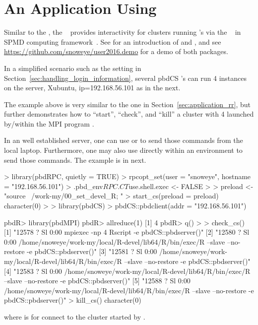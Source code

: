 
\section[An Application Using \pkg{pbdCS}]{An Application Using }
\label{sec:application_cs}

Similar to the , the ~\citep{pbdCS} provides
interactivity for clusters running 's via the
~\citep{Chen2012pbdMPIpackage} in SPMD computing
framework~\citep{pbdR2012,hpsc2012}.
See \citet{xsede16} for an introduction of  and , and
see \url{https://github.com/snoweye/user2016.demo}
for a demo of both packages.

In a simplified scenario such as the setting in
Section~\ref{sec:handling_login_information},
several pbdCS 's can run 4 instances on the server,
Xubuntu, ip=192.168.56.101 as in the next.
The example above is very similar to the one in
Section~\ref{sec:application_rr}, but further demonstrates
how to ``start'', ``check'', and ``kill''
a  cluster with 4  launched by/within
the MPI program .

In an well established server, one can use  or 
to send those commands from the local laptop.
Furthermore, one may also use  directly within an 
environment to send those commands. The example is in next.
\begin{Code}[title=Using \pkg{pbdRPC} to control \pkg{pbdCS}]
> library(pbdRPC, quietly = TRUE)
> rpcopt_set(user = "snoweye", hostname = "192.168.56.101")
> .pbd_env$RPC.CT$use.shell.exec <- FALSE
>
> preload <- "source ~/work-my/00_set_devel_R; "
> start_cs(preload = preload)
character(0)
>
> library(pbdCS)
> pbdCS::pbdclient(addr = "192.168.56.101")

pbdR> library(pbdMPI)
pbdR> allreduce(1)
[1] 4 
pbdR> q()
>
> check_cs()
[1] "12578 ?        Sl     0:00 mpiexec -np 4 Rscript -e pbdCS::pbdserver()"                                                      
[2] "12580 ?        Sl     0:00 /home/snoweye/work-my/local/R-devel/lib64/R/bin/exec/R --slave --no-restore -e pbdCS::pbdserver()"
[3] "12581 ?        Sl     0:00 /home/snoweye/work-my/local/R-devel/lib64/R/bin/exec/R --slave --no-restore -e pbdCS::pbdserver()"
[4] "12583 ?        Sl     0:00 /home/snoweye/work-my/local/R-devel/lib64/R/bin/exec/R --slave --no-restore -e pbdCS::pbdserver()"
[5] "12588 ?        Sl     0:00 /home/snoweye/work-my/local/R-devel/lib64/R/bin/exec/R --slave --no-restore -e pbdCS::pbdserver()"
> kill_cs()
character(0)
\end{Code}
where  is for connect to the  cluster
started by .

